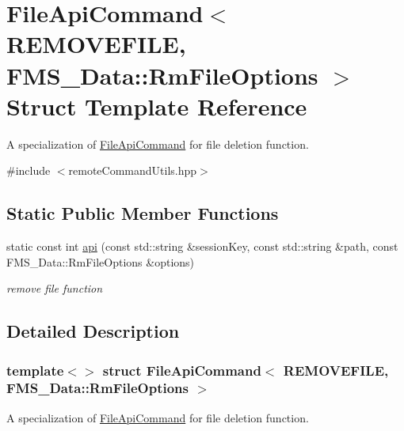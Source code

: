 \hypertarget{structFileApiCommand_3_01REMOVEFILE_00_01FMS__Data_1_1RmFileOptions_01_4}{
\section{FileApiCommand$<$ REMOVEFILE, FMS\_\-Data::RmFileOptions $>$ Struct Template Reference}
\label{structFileApiCommand_3_01REMOVEFILE_00_01FMS__Data_1_1RmFileOptions_01_4}
}


A specialization of \hyperlink{structFileApiCommand}{FileApiCommand} for file deletion function.  




{\ttfamily \#include $<$remoteCommandUtils.hpp$>$}

\subsection*{Static Public Member Functions}
\begin{DoxyCompactItemize}
\item 
static const int \hyperlink{structFileApiCommand_3_01REMOVEFILE_00_01FMS__Data_1_1RmFileOptions_01_4_a50e50672cbe92b5a944ad6784fa568bc}{api} (const std::string \&sessionKey, const std::string \&path, const FMS\_\-Data::RmFileOptions \&options)
\begin{DoxyCompactList}\small\item\em remove file function \item\end{DoxyCompactList}\end{DoxyCompactItemize}


\subsection{Detailed Description}
\subsubsection*{template$<$$>$ struct FileApiCommand$<$ REMOVEFILE, FMS\_\-Data::RmFileOptions $>$}

A specialization of \hyperlink{structFileApiCommand}{FileApiCommand} for file deletion function. 

